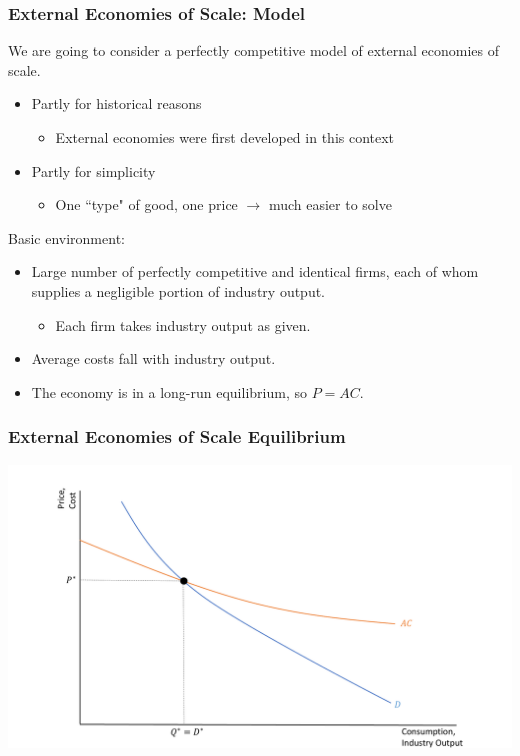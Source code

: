\documentclass{beamer}
\begin{document}
\begin{frame}
	\frametitle{External Economies of Scale: Model}
We are going to consider a perfectly competitive model of external economies of scale.
	\begin{itemize}
		\item Partly for historical reasons
			\begin{itemize}
				\item External economies were first developed in this context
			\end{itemize}
		\item Partly for simplicity
			\begin{itemize}
				\item One ``type" of good, one price $\rightarrow$ much easier to solve
			\end{itemize}
	\end{itemize}
Basic environment:
	\begin{itemize}
		\item Large number of perfectly competitive and identical firms, each of whom supplies a negligible portion of industry output.
			\begin{itemize}
				\item Each firm takes industry output as given.	
			\end{itemize}
		\item Average costs fall with industry output.
		\item The economy is in a long-run equilibrium, so $P=AC$.
	\end{itemize}
	
\end{frame}

\begin{frame}
	\frametitle{External Economies of Scale Equilibrium}
		\includegraphics[scale=0.32]{SL4_17.pdf}
\end{frame}
\end{document}
